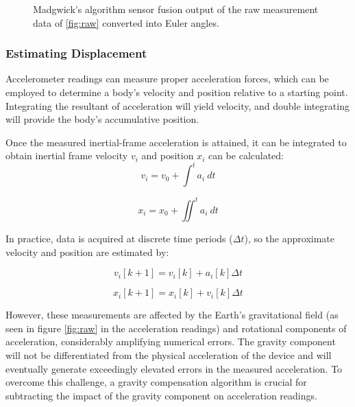\begin{figure}
  \centering
  \resizebox{0.8\linewidth}{!}{}
  \caption{Madgwick's algorithm sensor fusion output of the raw measurement data of  \ref{fig:raw} converted into Euler angles.}
  \label{fig:fusion_output_euler}
\end{figure}


\newpage

\subsubsection{Estimating Displacement}

Accelerometer readings can measure proper acceleration forces, which can be employed to determine a body's velocity and position relative to a starting point. Integrating the resultant of acceleration will yield velocity, and double integrating will provide the body's accumulative position.

Once the measured inertial-frame acceleration is attained, it can be integrated to obtain inertial frame velocity $v_i$  and position $x_i$ can be calculated:
\begin{equation}
  v_i = v_0 +  \int^t a_i~dt
\end{equation}

\begin{equation}
  x_i = x_0 + \iint^t a_i~dt
\end{equation}

In practice, data is acquired at discrete time periods ($\Delta t$), so the approximate velocity and position are estimated by:

\begin{equation}
  v_i[k+1]= v_i[k]+a_i[k]\Delta t
\end{equation}

\begin{equation}
  x_i[k+1]= x_i[k]+v_i[k]\Delta t
\end{equation}

However, these measurements are affected by the Earth's gravitational field (as seen in figure \ref{fig:raw} in the acceleration readings) and rotational components of acceleration, considerably amplifying numerical errors. The gravity component will not be differentiated from the physical acceleration of the device and will eventually generate exceedingly elevated errors in the measured acceleration. To overcome this challenge, a gravity compensation algorithm is crucial for subtracting the impact of the gravity component on acceleration readings.

